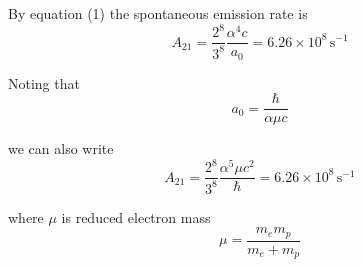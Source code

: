 By equation (1) the spontaneous emission rate is
\begin{equation*}
A_{21}=\frac{2^8}{3^8}\frac{\alpha^4c}{a_0}=6.26\times10^8\,\text{s}^{-1}
\end{equation*}

Noting that
\begin{equation*}
a_0=\frac{\hbar}{\alpha\mu c}
\end{equation*}

we can also write
\begin{equation*}
A_{21}=\frac{2^8}{3^8}\frac{\alpha^5\mu c^2}{\hbar}=6.26\times10^8\,\text{s}^{-1}
\end{equation*}

where $\mu$ is reduced electron mass
\begin{equation*}
\mu=\frac{m_em_p}{m_e+m_p}
\end{equation*}


